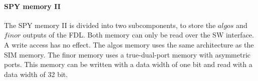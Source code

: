 % 

\paragraph{SPY memory II}
The SPY memory II is divided into two subcomponents, to store the $algos$ and $finor$ outputs of the FDL. 
Both memory can only be read over the SW interface. A write access has no effect.
The algos memory uses the same architecture as the SIM memory.
The finor memory uses a true-dual-port memory with asymmetric ports. This memory can be written with a data width of one bit and read with a data width of 32 bit. 

